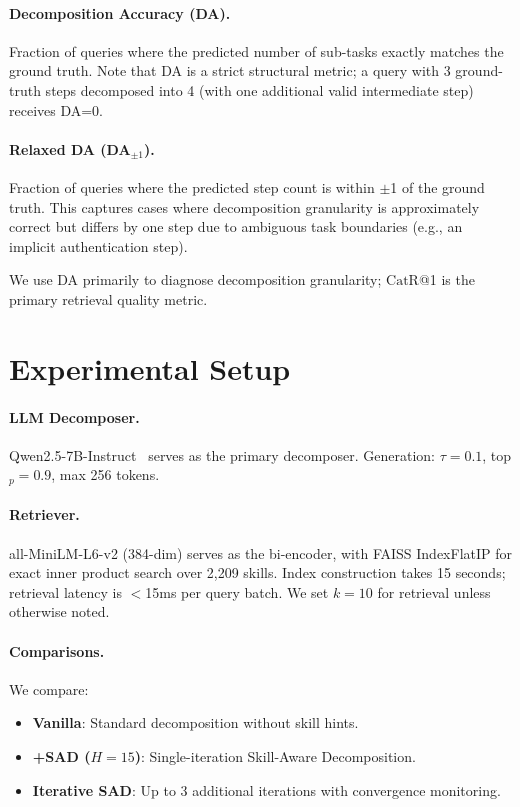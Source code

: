 \documentclass[11pt]{article}
\newcommand{\catrecall}{\text{CatR}}
\begin{document}
\paragraph{Decomposition Accuracy (DA).} Fraction of queries where the predicted number of sub-tasks exactly matches the ground truth.
Note that DA is a strict structural metric; a query with 3 ground-truth steps decomposed into 4 (with one additional valid intermediate step) receives DA=0.

\paragraph{Relaxed DA (DA$_{\pm 1}$).} Fraction of queries where the predicted step count is within $\pm$1 of the ground truth. This captures cases where decomposition granularity is approximately correct but differs by one step due to ambiguous task boundaries (e.g., an implicit authentication step).

We use DA primarily to diagnose decomposition granularity; $\catrecall$@1 is the primary retrieval quality metric.

\section{Experimental Setup}
\label{sec:setup}

\paragraph{LLM Decomposer.}
Qwen2.5-7B-Instruct~\cite{qwen2.5} serves as the primary decomposer.
Generation: $\tau=0.1$, top$_p=0.9$, max 256 tokens.

\paragraph{Retriever.}
all-MiniLM-L6-v2 (384-dim) serves as the bi-encoder, with FAISS IndexFlatIP for exact inner product search over 2{,}209 skills.
Index construction takes 15 seconds; retrieval latency is $<$15ms per query batch.
We set $k=10$ for retrieval unless otherwise noted.

\paragraph{Comparisons.}
We compare:
\begin{itemize}[nosep,leftmargin=*]
  \item \textbf{Vanilla}: Standard decomposition without skill hints.
  \item \textbf{+SAD ($H{=}15$)}: Single-iteration Skill-Aware Decomposition.
  \item \textbf{Iterative SAD}: Up to 3 additional iterations with convergence monitoring.
\end{itemize}
\end{document}

